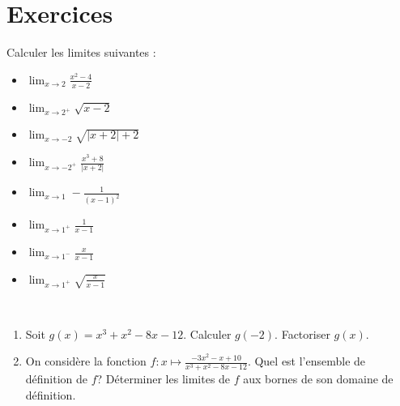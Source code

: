 

























\TCDLessonStyleOff
\clearpage
\section{Exercices}
      \begin{exo}
\label{exo:fn limites1}
      Calculer les limites suivantes : \\
            \begin{itemize}
                  \item $\lim_{x\rightarrow 2}\frac{x^2 - 4}{x-2}$
                  \item $\lim_{x\rightarrow 2^+} \sqrt{x-2}$
                  \item $\lim_{x\rightarrow -2} \sqrt{|x+2| + 2} $
                  \item $\lim_{x\rightarrow-2^+} \frac{x^3 + 8}{|x+2|} $
                  \item $ \lim_{x\rightarrow 1} -\frac{1}{(x-1)^2} $
                  \item $ \lim_{x\rightarrow 1^+} \frac{1}{x-1} $
                  \item $ \lim_{x\rightarrow 1^-} \frac{x}{x-1} $
                  \item $ \lim_{x\rightarrow 1^+} \sqrt{\frac{x}{x-1}} $
            \end{itemize}
      \end{exo}
%
      \begin{exo}~\\
\label{exo:fn facto1}
            \begin{enumerate}
                  \item Soit $g(x) = x^3 + x^2 - 8 x - 12$.
                        Calculer $g(-2)$. Factoriser $g(x)$.
                  \item On consid\`ere la fonction $f : x \mapsto \frac{-3x^2-x+10}{x^3+x^2-8x-12}$.
                        Quel est l'ensemble de d\'efinition de $f$?
                        D\'eterminer les limites de $f$ aux bornes de son domaine de d\'efinition.
            \end{enumerate}
      \end{exo}
